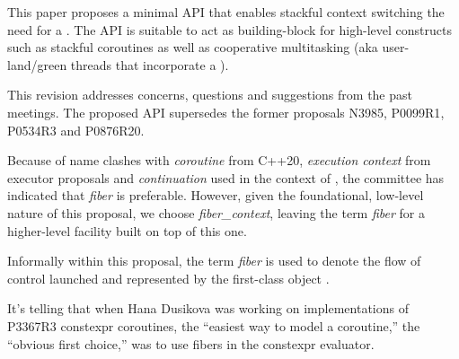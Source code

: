 \label{abstract}

This paper proposes a
minimal API that enables stackful context switching  the need for a
. The API is suitable to act as building-block for high-level
constructs such as stackful coroutines as well as cooperative multitasking
(aka user-land/green threads that incorporate a ).

This revision addresses concerns, questions and suggestions from the past meetings.
The proposed API supersedes the former proposals N3985\cite{N3985},
P0099R1\cite{P0099R1}, P0534R3\cite{P0534R3} and P0876R20\cite{P0876R20}.

Because of name clashes with \emph{coroutine} from C++20,
\emph{execution context} from executor proposals and \emph{continuation} used
in the context of , the committee has indicated
that \emph{fiber} is preferable. However, given the foundational, low-level
nature of this proposal, we choose \emph{fiber\_context}, leaving the
term \emph{fiber} for a higher-level facility built on top of this one.

Informally within this proposal, the term \emph{fiber} is used to denote the
flow of control launched and represented by the first-class object \fiber.

It's telling that when Hana Dusikova was working on implementations of P3367R3
constexpr coroutines\cite{P3367R3}, the ``easiest way to model a coroutine,''
the ``obvious first choice,'' was to use fibers in the constexpr evaluator.
